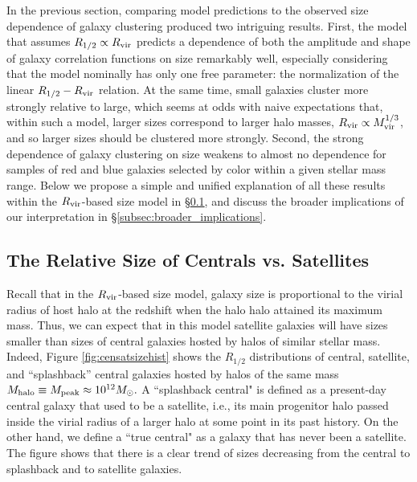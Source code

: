 \documentclass[usenatbib,usegraphicx,letterpaper]{mn2e}
\newcommand{\rhalf}{R_{1/2}}
\newcommand{\mvir}{M_{\rm vir}}
\newcommand{\mpeak}{M_{\rm peak}}
\newcommand{\mhalo}{M_{\rm halo}}
\newcommand{\rvir}{R_{\rm vir}}
\newcommand{\msun}{M_\odot}
\begin{document}
In the previous section, comparing model predictions to the observed size dependence of galaxy clustering produced two intriguing results. First, the model that assumes $\rhalf\propto\rvir$ predicts a dependence of both the amplitude and shape of  galaxy correlation functions on size remarkably well, especially considering that the model nominally has only one free parameter: the normalization of the linear $\rhalf-\rvir$ relation. At the same time, small galaxies cluster more strongly relative to large, which seems at odds with naive expectations that, within such a model, larger sizes correspond to larger halo masses, $\rvir\propto\mvir^{1/3}$, and so larger sizes should be clustered more strongly. Second, the strong dependence of galaxy clustering on size weakens to almost no dependence for samples of red and blue galaxies selected by color within a given stellar mass range.
Below we propose a simple and unified explanation of all these results within the $\rvir$-based size model in \S\ref{subsec:censat_sizes}, and discuss the broader implications of our interpretation in \S\ref{subsec:broader_implications}.

\subsection{The Relative Size of Centrals vs. Satellites}
\label{subsec:censat_sizes}

Recall that in the $\rvir$-based size model, galaxy size is proportional to the virial radius of host halo at the redshift  when the halo halo attained its maximum mass. Thus, we can expect that in this model satellite galaxies will have sizes smaller than sizes of central galaxies hosted by halos of similar stellar mass.  Indeed, Figure \ref{fig:censatsizehist} shows the $\rhalf$ distributions of central, satellite, and ``splashback'' central galaxies hosted by halos of the same mass $\mhalo\equiv\mpeak\approx10^{12}\msun.$ A ``splashback central"  is defined as a present-day central galaxy that used to be a satellite, i.e., its main progenitor halo passed inside the virial radius of a larger halo at some point in its past history. On the other hand, we define a ``true central" as a galaxy that has never been a satellite. The figure shows that there is a clear trend of sizes decreasing from the central to splashback and to satellite galaxies.
\end{document}
